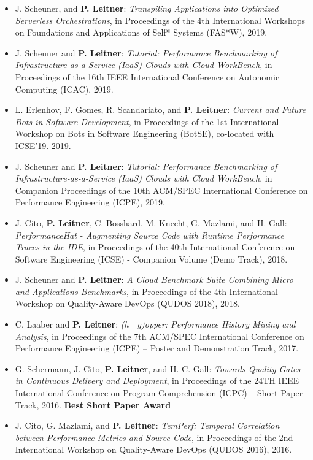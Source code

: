 \documentclass[paper=letter,fontsize=11pt]{scrartcl} %
\begin{document}
\begin{itemize}
	\item J. Scheuner, and \textbf{P. Leitner}:
\emph{Transpiling Applications into Optimized Serverless Orchestrations}, in Proceedings of the 4th International Workshops on Foundations and Applications of Self* Systems (FAS*W), 2019.
	\item J. Scheuner and \textbf{P. Leitner}: \emph{Tutorial: Performance Benchmarking of Infrastructure-as-a-Service (IaaS) Clouds with Cloud WorkBench}, in Proceedings of the 16th IEEE International Conference on Autonomic Computing (ICAC), 2019.
	\item L. Erlenhov, F. Gomes, R. Scandariato, and \textbf{P. Leitner}: \emph{Current and Future Bots in Software Development}, in Proceedings of the 1st International Workshop on
Bots in Software Engineering (BotSE), co-located with ICSE'19. 2019.
	\item J. Scheuner and \textbf{P. Leitner}: \emph{Tutorial: Performance Benchmarking of Infrastructure-as-a-Service (IaaS) Clouds with Cloud WorkBench}, in Companion Proceedings of the 10th ACM/SPEC International Conference on Performance Engineering (ICPE), 2019.
	\item J. Cito, \textbf{P. Leitner}, C. Bosshard, M. Knecht, G. Mazlami, and H. Gall: \emph{PerformanceHat - Augmenting Source Code with Runtime Performance Traces in the IDE}, in Proceedings of the 40th International Conference on Software Engineering (ICSE) - Companion Volume (Demo Track), 2018.
	\item J. Scheuner and \textbf{P. Leitner}: \emph{A Cloud Benchmark Suite Combining Micro and Applications Benchmarks}, in Proceedings of the 4th International Workshop on Quality-Aware DevOps (QUDOS 2018), 2018.
	\item C. Laaber and \textbf{P. Leitner}: \emph{ (h $|$ g)opper: Performance History Mining and Analysis},  in Proceedings of the 7th ACM/SPEC International Conference on Performance Engineering (ICPE) -- Poster and Demonstration Track, 2017.
	\item G. Schermann, J. Cito, \textbf{P. Leitner}, and H. C. Gall: \emph{Towards Quality Gates in Continuous Delivery and Deployment}, in Proceedings of the 24TH IEEE International Conference on Program Comprehension (ICPC) – Short Paper Track, 2016. \textbf{Best Short Paper Award}
	\item J. Cito, G. Mazlami, and \textbf{P. Leitner}: \emph{TemPerf: Temporal Correlation between Performance Metrics and Source Code}, in Proceedings of the 2nd International Workshop on Quality-Aware DevOps (QUDOS 2016), 2016.

\end{itemize}
\end{document}
